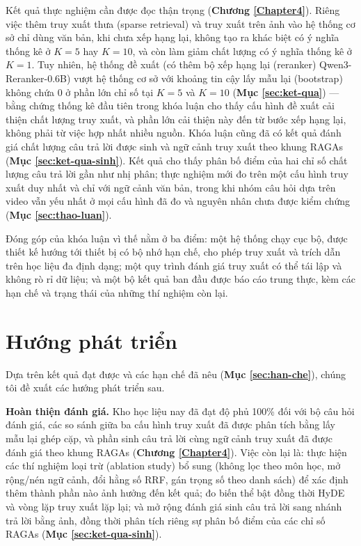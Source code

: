 \bigbreak\noindent
Kết quả thực nghiệm cần được đọc thận trọng (\textbf{Chương \ref{Chapter4}}). Riêng việc thêm truy xuất thưa (sparse retrieval) và truy xuất trên ảnh vào hệ thống cơ sở chỉ dùng văn bản, khi chưa xếp hạng lại, không tạo ra khác biệt có ý nghĩa thống kê ở $K = 5$ hay $K = 10$, và còn làm giảm chất lượng có ý nghĩa thống kê ở $K = 1$. Tuy nhiên, hệ thống đề xuất (có thêm bộ xếp hạng lại (reranker) Qwen3-Reranker-0.6B) vượt hệ thống cơ sở với khoảng tin cậy lấy mẫu lại (bootstrap) không chứa 0 ở phần lớn chỉ số tại $K = 5$ và $K = 10$ (\textbf{Mục \ref{sec:ket-qua}}) — bằng chứng thống kê đầu tiên trong khóa luận cho thấy cấu hình đề xuất cải thiện chất lượng truy xuất, và phần lớn cải thiện này đến từ bước xếp hạng lại, không phải từ việc hợp nhất nhiều nguồn. Khóa luận cũng đã có kết quả đánh giá chất lượng câu trả lời được sinh và ngữ cảnh truy xuất theo khung RAGAs (\textbf{Mục \ref{sec:ket-qua-sinh}}). Kết quả cho thấy phân bố điểm của hai chỉ số chất lượng câu trả lời gần như nhị phân; thực nghiệm mới đo trên một cấu hình truy xuất duy nhất và chỉ với ngữ cảnh văn bản, trong khi nhóm câu hỏi dựa trên video vẫn yếu nhất ở mọi cấu hình đã đo và nguyên nhân chưa được kiểm chứng (\textbf{Mục \ref{sec:thao-luan}}).

\bigbreak\noindent
Đóng góp của khóa luận vì thế nằm ở ba điểm: một hệ thống chạy cục bộ, được thiết kế hướng tới thiết bị có bộ nhớ hạn chế, cho phép truy xuất và trích dẫn trên học liệu đa định dạng; một quy trình đánh giá truy xuất có thể tái lập và không rò rỉ dữ liệu; và một bộ kết quả ban đầu được báo cáo trung thực, kèm các hạn chế và trạng thái của những thí nghiệm còn lại.

\section{Hướng phát triển}

Dựa trên kết quả đạt được và các hạn chế đã nêu (\textbf{Mục \ref{sec:han-che}}), chúng tôi đề xuất các hướng phát triển sau.

\bigbreak\noindent
\textbf{Hoàn thiện đánh giá.} Kho học liệu nay đã đạt độ phủ 100\% đối với bộ câu hỏi đánh giá, các so sánh giữa ba cấu hình truy xuất đã được phân tích bằng lấy mẫu lại ghép cặp, và phần sinh câu trả lời cùng ngữ cảnh truy xuất đã được đánh giá theo khung RAGAs \cite{es2024ragas} (\textbf{Chương \ref{Chapter4}}). Việc còn lại là: thực hiện các thí nghiệm loại trừ (ablation study) bổ sung (không lọc theo môn học, mở rộng/nén ngữ cảnh, đổi hằng số RRF, gán trọng số theo danh sách) để xác định thêm thành phần nào ảnh hưởng đến kết quả; đo biến thể bật đồng thời HyDE và vòng lặp truy xuất lặp lại; và mở rộng đánh giá sinh câu trả lời sang nhánh trả lời bằng ảnh, đồng thời phân tích riêng sự phân bố điểm của các chỉ số RAGAs (\textbf{Mục \ref{sec:ket-qua-sinh}}).

